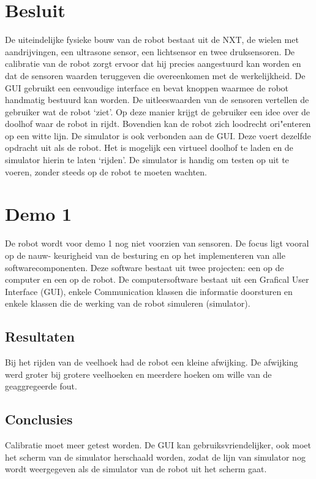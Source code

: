 \documentclass[tt3]{penoverslag}
\begin{document}
\section{Besluit} %
\label{sec:besl}
De uiteindelijke fysieke bouw van de robot bestaat uit de NXT, de wielen met aandrijvingen, een ultrasone sensor, een lichtsensor en twee druksensoren.
De calibratie van de robot zorgt ervoor dat hij precies aangestuurd kan worden en dat de sensoren waarden teruggeven die overeenkomen met de werkelijkheid.
De GUI gebruikt een eenvoudige interface en bevat knoppen waarmee de robot handmatig bestuurd kan worden. De uitleeswaarden van de sensoren vertellen de gebruiker wat de robot `ziet'. Op deze manier krijgt de gebruiker een idee over de doolhof waar de robot in rijdt. Bovendien kan de robot zich loodrecht ori"enteren op een witte lijn. De simulator is ook verbonden aan de GUI. Deze voert dezelfde opdracht uit als de robot. Het is mogelijk een virtueel doolhof te laden en de simulator hierin te laten `rijden'. De simulator is handig om testen op uit te voeren, zonder steeds op de robot te moeten wachten.


\newpage
\makeappendix

\section{Demo 1} %
\label{Asec:demo1}
De robot wordt voor demo 1 nog niet voorzien van sensoren. De focus ligt vooral op de nauw-
keurigheid van de besturing en op het implementeren van alle softwarecomponenten. Deze software
bestaat uit twee projecten: een op de computer en een op de robot. De computersoftware bestaat
uit een Grafical User Interface (GUI), enkele Communication klassen die informatie doorsturen en
enkele klassen die de werking van de robot simuleren (simulator).

\subsection{Resultaten} %
\label{Assec:result1}
Bij het rijden van de veelhoek had de robot een kleine afwijking. De afwijking werd groter bij grotere veelhoeken en meerdere hoeken om wille van de geaggregeerde fout.

\subsection{Conclusies} %
\label{Assec:conc1}
Calibratie moet meer getest worden. De GUI kan gebruiksvriendelijker, ook moet het scherm van de simulator herschaald worden, zodat de lijn van simulator nog wordt weergegeven als de simulator van de robot uit het scherm gaat.
\end{document}

